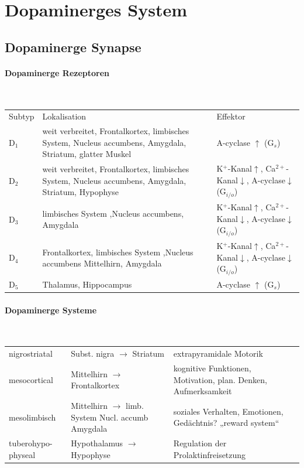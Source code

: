 \documentclass[10pt,a4paper]{report}
\begin{document}
\section{Dopaminerges System} %
\label{sec:dopaminerges_system}
\subsection{Dopaminerge Synapse} %
\label{sub:dopaminerge_synapse}
\paragraph{Dopaminerge Rezeptoren} %
\label{par:dopaminerge_rezeptoren}
\mbox{}\\
\begin{tabularx}{\textwidth}{lXX}
Subtyp&Lokalisation&Effektor\\
D$_1$&weit verbreitet, Frontalkortex, limbisches System, Nucleus accumbens, Amygdala, Striatum, glatter Muskel&A-cyclase $\uparrow$ (G$_s$)\\
D$_2$&weit verbreitet, Frontalkortex, limbisches System, Nucleus accumbens, Amygdala, Striatum, Hypophyse&K$^+$-Kanal$\uparrow$, Ca$^{2+}$-Kanal$\downarrow$, A-cyclase$\downarrow$ (G$_{i/o}$)\\
D$_3$&limbisches System ,Nucleus accumbens, Amygdala&K$^+$-Kanal$\uparrow$, Ca$^{2+}$-Kanal$\downarrow$, A-cyclase$\downarrow$ (G$_{i/o}$)\\
D$_4$&Frontalkortex, limbisches System ,Nucleus accumbens Mittelhirn, Amygdala&K$^+$-Kanal$\uparrow$, Ca$^{2+}$-Kanal$\downarrow$, A-cyclase$\downarrow$ (G$_{i/o}$)\\
D$_5$&Thalamus, Hippocampus&A-cyclase $\uparrow$ (G$_s$)\\
\end{tabularx}
\paragraph{Dopaminerge Systeme} %
\label{par:dopaminerge_systeme}
\mbox{}\\
\begin{tabularx}{\textwidth}{lXX}
nigrostriatal&Subst. nigra $\rightarrow$ Striatum&extrapyramidale Motorik\\
mesocortical&Mittelhirn $\rightarrow$ Frontalkortex&kognitive Funktionen, 	Motivation, plan. Denken, Aufmerksamkeit\\
mesolimbisch&Mittelhirn $\rightarrow$ limb. System  Nucl. accumb Amygdala&soziales Verhalten, Emotionen, Gedächtnis? „reward system“\\
tuberohypo-physeal&Hypothalamus $\rightarrow$ Hypophyse&Regulation der  Prolaktinfreisetzung\\
\end{tabularx}
\end{document}
